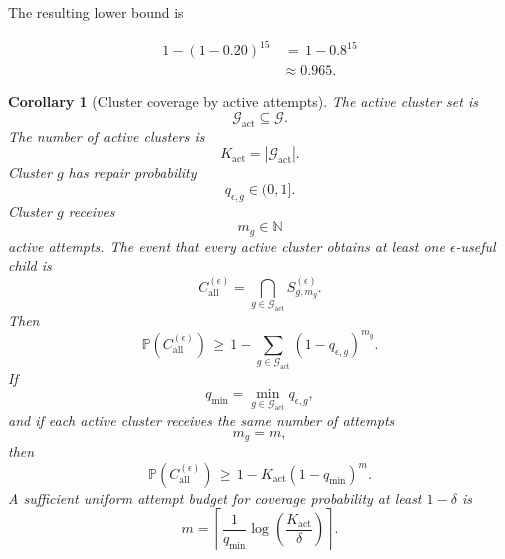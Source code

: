 \documentclass{article} %
\newtheorem{corollary}[theorem]{Corollary}
\begin{document}
The resulting lower bound is

\begin{align}
\label{eq:app-third-example-prob}
1-(1-0.20)^{15}
&\,=\,
1-0.8^{15}
\\
&\approx
0.965.
\end{align}

\begin{corollary}[Cluster coverage by active attempts]
\label{cor:app-specialist-coverage}
The active cluster set is
\begin{equation}
\label{eq:app-third-active-clusters}
\mathcal{G}_{\mathrm{act}}
\subseteq
\mathcal{G}.
\end{equation}
The number of active clusters is
\begin{equation}
\label{eq:app-third-active-count}
K_{\mathrm{act}}
=
|\mathcal{G}_{\mathrm{act}}|.
\end{equation}
Cluster \(g\) has repair probability
\begin{equation}
\label{eq:app-third-cluster-q}
q_{\epsilon,g}
\in
(0,1].
\end{equation}
Cluster \(g\) receives
\begin{equation}
\label{eq:app-third-cluster-m}
m_g
\in
\mathbb{N}
\end{equation}
active attempts. The event that every active cluster obtains at least one \(\epsilon\)-useful child is
\begin{equation}
\label{eq:app-third-coverage-event}
C_{\mathrm{all}}^{(\epsilon)}
=
\bigcap_{g\in\mathcal{G}_{\mathrm{act}}}
S_{g,m_g}^{(\epsilon)}.
\end{equation}
Then
\begin{equation}
\label{eq:app-third-coverage-bound}
\mathbb{P}\!\left(
C_{\mathrm{all}}^{(\epsilon)}
\right)
\,\ge\,
1-
\sum_{g\in\mathcal{G}_{\mathrm{act}}}
(1-q_{\epsilon,g})^{m_g}.
\end{equation}
If
\begin{equation}
\label{eq:app-third-qmin}
q_{\min}
=
\min_{g\in\mathcal{G}_{\mathrm{act}}}
q_{\epsilon,g},
\end{equation}
and if each active cluster receives the same number of attempts
\begin{equation}
\label{eq:app-third-uniform-m}
m_g
=
m,
\end{equation}
then
\begin{equation}
\label{eq:app-third-uniform-coverage}
\mathbb{P}\!\left(
C_{\mathrm{all}}^{(\epsilon)}
\right)
\,\ge\,
1-
K_{\mathrm{act}}(1-q_{\min})^{m}.
\end{equation}
A sufficient uniform attempt budget for coverage probability at least \(1-\delta\) is
\begin{equation}
\label{eq:app-third-coverage-complexity}
m
=
\left\lceil
\frac{1}{q_{\min}}
\log\!\left(\frac{K_{\mathrm{act}}}{\delta}\right)
\right\rceil .
\end{equation}
\end{corollary}
\end{document}

